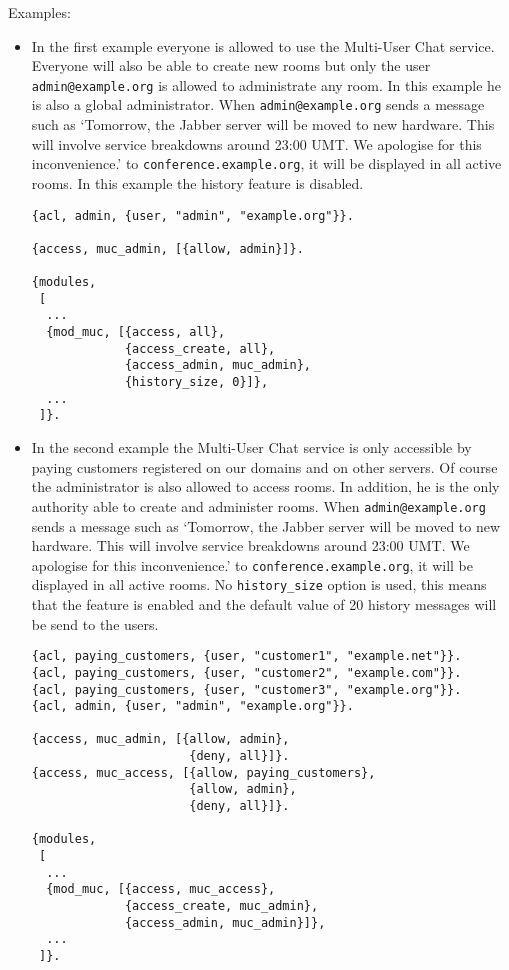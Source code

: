 \documentclass[a4paper,10pt]{book}
\newcommand{\jid}[1]{\texttt{#1}}
\newcommand{\term}[1]{\texttt{#1}}
\newcommand{\Jabber}{Jabber}
\begin{document}
Examples:
\begin{itemize}
\item In the first example everyone is allowed to use the Multi-User Chat
  service. Everyone will also be able to create new rooms but only the user
  \jid{admin@example.org} is allowed to administrate any room. In this
  example he is also a global administrator. When \jid{admin@example.org}
  sends a message such as `Tomorrow, the \Jabber{} server will be moved
  to new hardware. This will involve service breakdowns around 23:00 UMT.
  We apologise for this inconvenience.' to \jid{conference.example.org},
  it will be displayed in all active rooms. In this example the history
  feature is disabled.
\begin{verbatim}
{acl, admin, {user, "admin", "example.org"}}.

{access, muc_admin, [{allow, admin}]}.

{modules,
 [
  ...
  {mod_muc, [{access, all},
             {access_create, all},
             {access_admin, muc_admin},
             {history_size, 0}]},
  ...
 ]}.
\end{verbatim}
\item In the second example the Multi-User Chat service is only accessible by
  paying customers registered on our domains and on other servers. Of course
  the administrator is also allowed to access rooms. In addition, he is the
  only authority able to create and administer rooms. When
  \jid{admin@example.org} sends a message such as `Tomorrow, the \Jabber{}
  server will be moved to new hardware. This will involve service breakdowns
  around 23:00 UMT. We apologise for this inconvenience.' to
  \jid{conference.example.org}, it will be displayed in all active rooms. No
  \term{history\_size} option is used, this means that the feature is enabled
  and the default value of 20 history messages will be send to the users.
\begin{verbatim}
{acl, paying_customers, {user, "customer1", "example.net"}}.
{acl, paying_customers, {user, "customer2", "example.com"}}.
{acl, paying_customers, {user, "customer3", "example.org"}}.
{acl, admin, {user, "admin", "example.org"}}.

{access, muc_admin, [{allow, admin},
                      {deny, all}]}.
{access, muc_access, [{allow, paying_customers},
                      {allow, admin},
                      {deny, all}]}.

{modules,
 [
  ...
  {mod_muc, [{access, muc_access},
             {access_create, muc_admin},
             {access_admin, muc_admin}]},
  ...
 ]}.
\end{verbatim}


\end{itemize}
\end{document}
